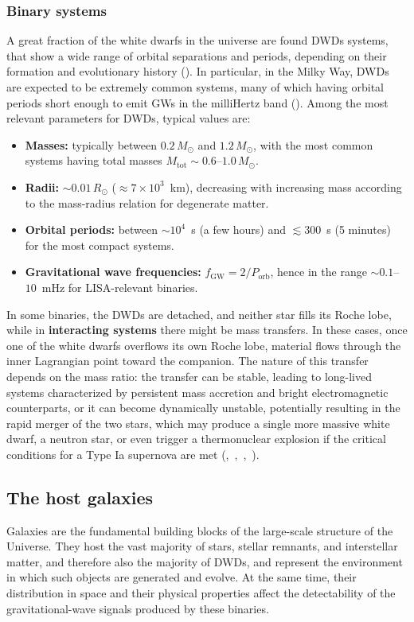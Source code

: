 \subsubsection{Binary systems}
A great fraction of the white dwarfs in the universe are found DWDs systems, that show a wide range of orbital separations and periods, depending on their formation and evolutionary history ({\cite{evolution_compact_binary_wd_systems}}).  
In particular, in the Milky Way, DWDs are expected to be extremely common systems, many of which having orbital periods short enough to emit GWs in the milliHertz band ({\cite{Nelemans_2001}}).  
Among the most relevant parameters for DWDs, typical values are:
\begin{itemize}
    \item \textbf{Masses:} typically between $0.2\,M_\odot$ and $1.2\,M_\odot$, with the most common systems having total masses $M_{\mathrm{tot}} \sim 0.6$--$1.0\,M_\odot$.
    \item \textbf{Radii:} $\sim 0.01\,R_\odot$ ($\approx 7\times 10^{3}$~km), decreasing with increasing mass according to the mass-radius relation for degenerate matter.
    \item \textbf{Orbital periods:} between $\sim 10^{4}$~s (a few hours) and $\lesssim 300$~s (5 minutes) for the most compact systems.
    \item \textbf{Gravitational wave frequencies:} $f_{\mathrm{GW}} = 2/P_{\mathrm{orb}}$, hence in the range $\sim 0.1$--$10$~mHz for LISA-relevant binaries.
\end{itemize}
In some binaries, the DWDs are detached, and neither star fills its Roche lobe, while in \textbf{interacting systems} there might be mass transfers.
In these cases, once one of the white dwarfs overflows its own Roche lobe, material flows through the inner Lagrangian point toward the companion.
The nature of this transfer depends on the mass ratio: the transfer can be stable, leading to long-lived systems characterized by persistent mass accretion and bright electromagnetic counterparts, or it can become dynamically unstable, potentially resulting in the rapid merger of the two stars, which may produce a single more massive white dwarf, a neutron star, or even trigger a thermonuclear explosion if the critical conditions for a Type Ia supernova are met ({\cite{Das2025},~\cite{Shen_2009},~\cite{refId0},~\cite{Shen_2018}}).


\subsection{{The host galaxies}}
Galaxies are the fundamental building blocks of the large-scale structure of the Universe. 
They host the vast majority of stars, stellar remnants, and interstellar matter, and therefore also the majority of DWDs, and represent the environment in which such objects are generated and evolve.  
At the same time, their distribution in space and their physical properties affect the detectability of the gravitational-wave signals produced by these binaries.  

